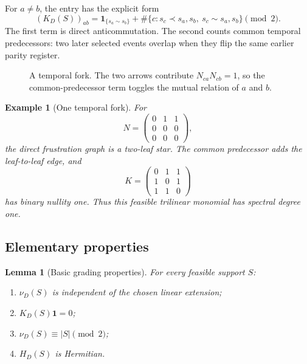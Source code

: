 \documentclass[10pt,letterpaper]{article}
\newtheorem{lemma}[theorem]{Lemma}
\newtheorem{example}[theorem]{Example}
\newcommand{\one}{\mathbf 1}
\begin{document}
For \(a\ne b\), the entry has the explicit form
\begin{equation}\label{eq:K-entry}
 (K_D(S))_{ab}
 =\mathbf1_{\{s_a\sim s_b\}}
 +\#\{c:s_c\prec s_a,s_b,\ s_c\sim s_a,s_b\}\pmod2.
\end{equation}
The first term is direct anticommutation.  The second counts common temporal predecessors: two later selected events overlap when they flip the same earlier parity register.

\begin{figure}[t]
\centering
{}
\caption{A temporal fork.  The two arrows contribute \(N_{ca}N_{cb}=1\), so the common-predecessor term toggles the mutual relation of \(a\) and \(b\).}
\label{fig:temporal-fork}
\end{figure}

\begin{example}[One temporal fork]
For
\[
 N=\begin{pmatrix}0&1&1\\0&0&0\\0&0&0\end{pmatrix},
\]
the direct frustration graph is a two-leaf star.  The common predecessor adds the leaf-to-leaf edge, and
\[
 K=\begin{pmatrix}0&1&1\\1&0&1\\1&1&0\end{pmatrix}
\]
has binary nullity one.  Thus this feasible trilinear monomial has spectral degree one.
\end{example}

\subsection{Elementary properties}

\begin{lemma}[Basic grading properties]\label{lem:grade-basic}
For every feasible support \(S\):
\begin{enumerate}[label=\textup{(\alph*)}]
\item \(\nu_D(S)\) is independent of the chosen linear extension;
\item \(K_D(S)\one=0\);
\item \(\nu_D(S)\equiv|S|\pmod2\);
\item \(H_D(S)\) is Hermitian.
\end{enumerate}
\end{lemma}
\end{document}
